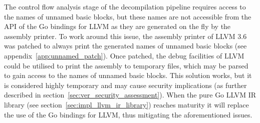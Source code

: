 The control flow analysis stage of the decompilation pipeline requires access to the names of unnamed basic blocks, but these names are not accessible from the API of the Go bindings for LLVM as they are generated on the fly by the assembly printer. To work around this issue, the assembly printer of LLVM 3.6 was patched to always print the generated names of unnamed basic blocks (see appendix~\ref{app:unnamed_patch}). Once patched, the debug facilities of LLVM could be utilised to print the assembly to temporary files, which may be parsed to gain access to the names of unnamed basic blocks. This solution works, but it is considered highly temporary and may cause security implications (as further described in section~\ref{sec:ver_security_assessment}). When the pure Go LLVM IR library (see section~\ref{sec:impl_llvm_ir_library}) reaches maturity it will replace the use of the Go bindings for LLVM, thus mitigating the aforementioned issues.

